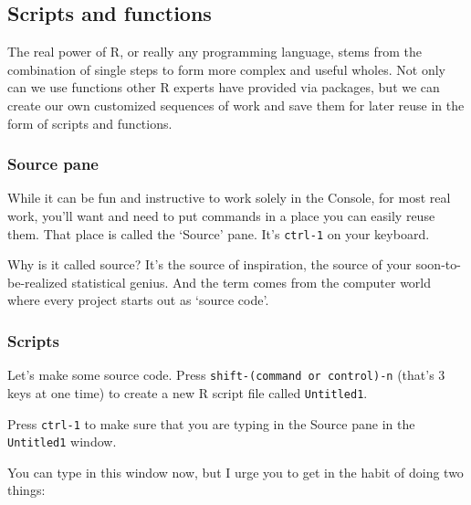\documentclass[]{article}
\begin{document}
\subsection{Scripts and functions}\label{scripts-and-functions}

The real power of R, or really any programming language, stems from the
combination of single steps to form more complex and useful wholes. Not
only can we use functions other R experts have provided via packages,
but we can create our own customized sequences of work and save them for
later reuse in the form of scripts and functions.

\subsubsection{Source pane}\label{source-pane}

While it can be fun and instructive to work solely in the Console, for
most real work, you'll want and need to put commands in a place you can
easily reuse them. That place is called the `Source' pane. It's
\texttt{ctrl-1} on your keyboard.

Why is it called source? It's the source of inspiration, the source of
your soon-to-be-realized statistical genius. And the term comes from the
computer world where every project starts out as `source code'.

\subsubsection{Scripts}\label{scripts}

Let's make some source code. Press
\texttt{shift-(command\ or\ control)-n} (that's 3 keys at one time) to
create a new R script file called \texttt{Untitled1}.

Press \texttt{ctrl-1} to make sure that you are typing in the Source
pane in the \texttt{Untitled1} window.

You can type in this window now, but I urge you to get in the habit of
doing two things:
\end{document}
